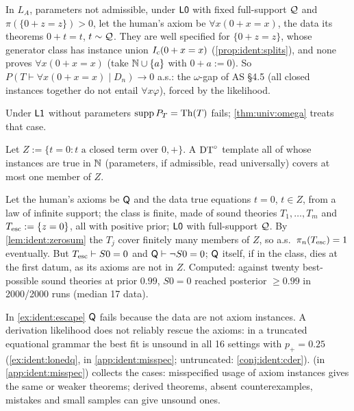 \begin{example}\label{ex:ident:weaker}
In $L_A$, parameters not admissible, under $\mathord{\mathsf{L0}}$ with fixed full-support $\mathcal{Q}$ and $\pi(\{0+z=z\})>0$, let the human's axiom be $\forall x(0+x=x)$, the data its theorems $0+t=t$, $t\sim\mathcal{Q}$. They are well specified for $\{0+z=z\}$, whose generator class has instance union $I_{\mathrm{c}}(0+x=x)$ (\cref{prop:ident:splits}), and none proves $\forall x(0+x=x)$ (take $\mathbb{N}\cup\{a\}$ with $0+a:=0$). So $P(T\vdash\forall x(0+x=x)\mid D_n)\to0$ a.s.: the $\omega$-gap of AS \S4.5 (all closed instances together do not entail $\forall x\varphi$), forced by the likelihood.
\end{example}

\noindent Under $\mathord{\mathsf{L1}}$ without parameters $\operatorname{supp}P_T=\mathrm{Th}(T)$ fails; \cref{thm:univ:omega} treats that case.

\begin{lemma}\label{lem:ident:zerosum}
Let $Z:=\{t=0:t\text{ a closed term over }0,+\}$. A $\mathrm{DT}^{\circ}$ template all of whose instances are true in $\mathbb{N}$ (parameters, if admissible, read universally) covers at most one member of $Z$.
\end{lemma}

\begin{example}\label{ex:ident:escape}
Let the human's axioms be $\mathsf{Q}$ and the data true equations $t=0$, $t\in Z$, from a law of infinite support; the class is finite, made of sound theories $T_1,\dots,T_m$ and $T_{\mathrm{esc}}:=\{z=0\}$, all with positive prior; $\mathord{\mathsf{L0}}$ with full-support $\mathcal{Q}$. By \cref{lem:ident:zerosum} the $T_j$ cover finitely many members of $Z$, so a.s.\ $\pi_n(T_{\mathrm{esc}})=1$ eventually. But $T_{\mathrm{esc}}\vdash S0=0$ and $\mathsf{Q}\vdash\neg S0=0$; $\mathsf{Q}$ itself, if in the class, dies at the first datum, as its axioms are not in $Z$. Computed: against twenty best-possible sound theories at prior $0.99$, $S0=0$ reached posterior $\ge0.99$ in 2000/2000 runs (median 17 data).
\end{example}

\noindent In \cref{ex:ident:escape} $\mathsf{Q}$ fails because the data are not axiom instances. A derivation likelihood does not reliably rescue the axioms: in a truncated equational grammar the best fit is unsound in all 16 settings with $p_+=0.25$ (\cref{ex:ident:lonedq}, in \cref{app:ident:misspec}; untruncated: \cref{conj:ident:cder}).  (in \cref{app:ident:misspec}) collects the cases: misspecified usage of axiom instances gives the same or weaker theorems; derived theorems, absent counterexamples, mistakes and small samples can give unsound ones.

